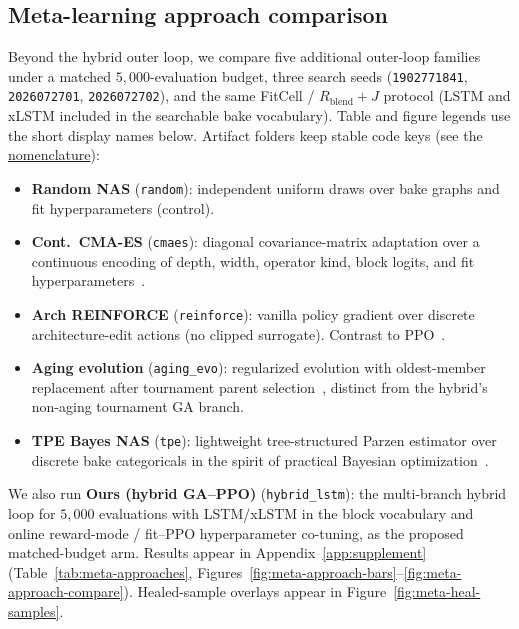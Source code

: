 \subsection{Meta-learning approach comparison}
\label{sec:meta-compare}

Beyond the hybrid outer loop, we compare five additional outer-loop families under a matched $5{,}000$-evaluation budget,
three search seeds (\texttt{1902771841}, \texttt{2026072701}, \texttt{2026072702}), and the same FitCell / $R_{\mathrm{blend}}{+}J$ protocol (LSTM and xLSTM included in the searchable bake vocabulary).
Table and figure legends use the short display names below. Artifact folders keep stable code keys (see the \href{https://github.com/reeldemo/denoise-opt-meta/blob/master/paper/Unsupervised_Wrap-Discontinuity_Repair_in_Wavetable_Synthesis_via_Hybrid_GA-PPO_Meta-Search_v12/NOMENCLATURE.md}{nomenclature}):
\begin{itemize}
  \item \textbf{Random NAS} (\texttt{random}): independent uniform draws over bake graphs and fit hyperparameters (control).
  \item \textbf{Cont.\ CMA-ES} (\texttt{cmaes}): diagonal covariance-matrix adaptation over a continuous encoding of depth, width, operator kind, block logits, and fit hyperparameters~\cite{hansen2016cmaes}.
  \item \textbf{Arch REINFORCE} (\texttt{reinforce}): vanilla policy gradient over discrete architecture-edit actions (no clipped surrogate). Contrast to PPO~\cite{schulman2017,zoph2017nas}.
  \item \textbf{Aging evolution} (\texttt{aging\_evo}): regularized evolution with oldest-member replacement after tournament parent selection~\cite{real2017large,real2019}, distinct from the hybrid's non-aging tournament GA branch.
  \item \textbf{TPE Bayes NAS} (\texttt{tpe}): lightweight tree-structured Parzen estimator over discrete bake categoricals in the spirit of practical Bayesian optimization~\cite{snoek2012}.
\end{itemize}
We also run \textbf{Ours (hybrid GA--PPO)} (\texttt{hybrid\_lstm}): the multi-branch hybrid loop for $5{,}000$ evaluations with LSTM/xLSTM in the block vocabulary and online reward-mode / fit--PPO hyperparameter co-tuning, as the proposed matched-budget arm.
Results appear in Appendix~\ref{app:supplement} (Table~\ref{tab:meta-approaches}, Figures~\ref{fig:meta-approach-bars}--\ref{fig:meta-approach-compare}). Healed-sample overlays appear in Figure~\ref{fig:meta-heal-samples}.

